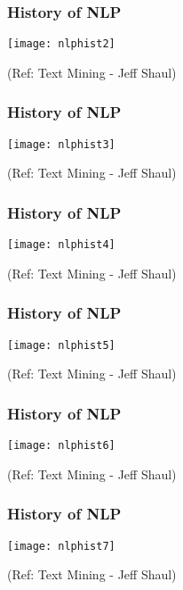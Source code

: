 \begin{frame}[fragile]\frametitle{History of NLP}
\begin{center}
\texttt{[image: nlphist2]}
\end{center}

{\tiny (Ref: Text Mining - Jeff Shaul)}
\end{frame}


\begin{frame}[fragile]\frametitle{History of NLP}
\begin{center}
\texttt{[image: nlphist3]}
\end{center}

{\tiny (Ref: Text Mining - Jeff Shaul)}
\end{frame}


\begin{frame}[fragile]\frametitle{History of NLP}
\begin{center}
\texttt{[image: nlphist4]}
\end{center}

{\tiny (Ref: Text Mining - Jeff Shaul)}
\end{frame}


\begin{frame}[fragile]\frametitle{History of NLP}
\begin{center}
\texttt{[image: nlphist5]}
\end{center}

{\tiny (Ref: Text Mining - Jeff Shaul)}
\end{frame}


\begin{frame}[fragile]\frametitle{History of NLP}
\begin{center}
\texttt{[image: nlphist6]}
\end{center}

{\tiny (Ref: Text Mining - Jeff Shaul)}
\end{frame}


\begin{frame}[fragile]\frametitle{History of NLP}
\begin{center}
\texttt{[image: nlphist7]}
\end{center}

{\tiny (Ref: Text Mining - Jeff Shaul)}
\end{frame}


